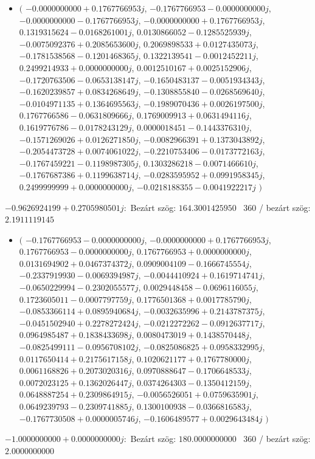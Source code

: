 \documentclass[14pt,a4paper]{article}
\begin{document}
\begin{itemize}
\item
$\big($
$-0.0000000000+0.1767766953j$, $-0.1767766953-0.0000000000j$, $-0.0000000000-0.1767766953j$, $-0.0000000000+0.1767766953j$, $0.1319315624-0.0168261001j$, $0.0130866052-0.1285525939j$, $-0.0075092376+0.2085653600j$, $0.2069898533+0.0127435073j$, $-0.1781538568-0.1201468365j$, $0.1322139541-0.0012452211j$, $0.2499214933+0.0000000000j$, $0.0012510167+0.0025152906j$, $-0.1720763506-0.0653138147j$, $-0.1650483137-0.0051934343j$, $-0.1620239857+0.0834268649j$, $-0.1308855840-0.0268569640j$, $-0.0104971135+0.1364695563j$, $-0.1989070436+0.0026197500j$, $0.1767766586-0.0631809666j$, $0.1769009913+0.0631494116j$, $0.1619776786-0.0178243129j$, $0.0000018451-0.1443376310j$, $-0.1571269026+0.0126271850j$, $-0.0082966391+0.1373043892j$, $-0.2054473728+0.0074061022j$, $-0.2210753406-0.0173772163j$, $-0.1767459221-0.1198987305j$, $0.1303286218-0.0071466610j$, $-0.1767687386+0.1199638714j$, $-0.0283595952+0.0991958345j$, $0.2499999999+0.0000000000j$, $-0.0218188355-0.0041922217j$
$\big)$
\end{itemize}
$-0.9626924199+0.2705980501j$:\
Bezárt szög: $164.3001425950$ \
360 / bezárt szög: $2.1911119145$\
\begin{itemize}
\item
$\big($
$-0.1767766953-0.0000000000j$, $-0.0000000000+0.1767766953j$, $0.1767766953-0.0000000000j$, $0.1767766953+0.0000000000j$, $0.0131694902+0.0467374372j$, $0.0909004109-0.1666745554j$, $-0.2337919930-0.0069394987j$, $-0.0044410924+0.1619714741j$, $-0.0650229994-0.2302055577j$, $0.0029448458-0.0696116055j$, $0.1723605011-0.0007797759j$, $0.1776501368+0.0017785790j$, $-0.0853366114+0.0895940684j$, $-0.0032635996+0.2143787375j$, $-0.0451502940+0.2278272424j$, $-0.0212272262-0.0912637717j$, $0.0964985487+0.1838433698j$, $0.0080473019+0.1438570448j$, $-0.0825499111-0.0956708102j$, $-0.0825086825+0.0958332995j$, $0.0117650414+0.2175617158j$, $0.1020621177+0.1767780000j$, $0.0061168826+0.2073020316j$, $0.0970888647-0.1706648533j$, $0.0072023125+0.1362026447j$, $0.0374264303-0.1350412159j$, $0.0648887254+0.2309864915j$, $-0.0056526051+0.0759635901j$, $0.0649239793-0.2309741885j$, $0.1300100938-0.0366816583j$, $-0.1767730508+0.0000005746j$, $-0.1606489577+0.0029643484j$
$\big)$
\end{itemize}
$-1.0000000000+0.0000000000j$:\
Bezárt szög: $180.0000000000$ \
360 / bezárt szög: $2.0000000000$\
\end{document}
